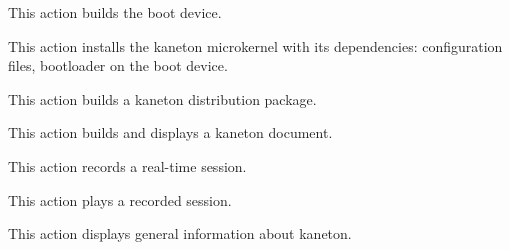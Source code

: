	{
	  This action builds the boot device.
	}

	{
	  This action installs the kaneton microkernel with its dependencies:
	  configuration files, bootloader \etc{} on the boot device.
	}

	{
	  This action builds a kaneton distribution package.

	  \-


	  \-


	  \-

	}

	{
	  This action builds and displays a kaneton document.

	  \-


	  \-


	  \-

	}

	{
	  This action records a real-time session.

	  \-


	  \-

	}

	{
	  This action plays a recorded session.

	  \-


	  \-


	  \-

	}

	{
	  This action displays general information about kaneton.
	}
